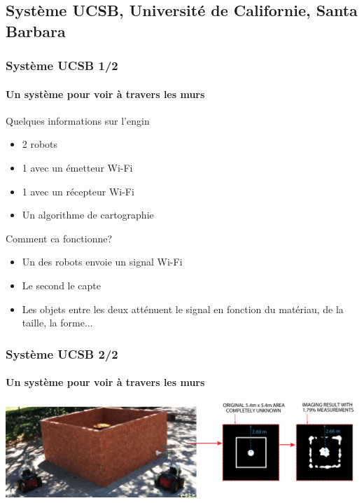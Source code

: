 \documentclass{beamer}
\begin{document}
\subsection{Système UCSB, Université de Californie, Santa Barbara}
\begin{frame}
  \frametitle{Système UCSB 1/2}
  \framesubtitle{Un système pour voir à travers les murs}
  \begin{block}{Quelques informations sur l'engin}
    \begin{itemize}
      \item 2 robots
      \item 1 avec un émetteur Wi-Fi
      \item 1 avec un récepteur Wi-Fi
      \item Un algorithme de cartographie
    \end{itemize}
  \end{block}
    \begin{block}{Comment ca fonctionne?}
    \begin{itemize}
    \item Un des robots envoie un signal Wi-Fi
    \item Le second le capte
    \item Les objets entre les deux atténuent le signal en fonction du matériau, de la taille, la forme...
    \end{itemize}
  \end{block}
\end{frame}

\begin{frame}
  \frametitle{Système UCSB 2/2}
  \framesubtitle{Un système pour voir à travers les murs}
  \includegraphics[width=\textwidth]{../Images/UCSB1.jpg}
\end{frame}
\end{document}
